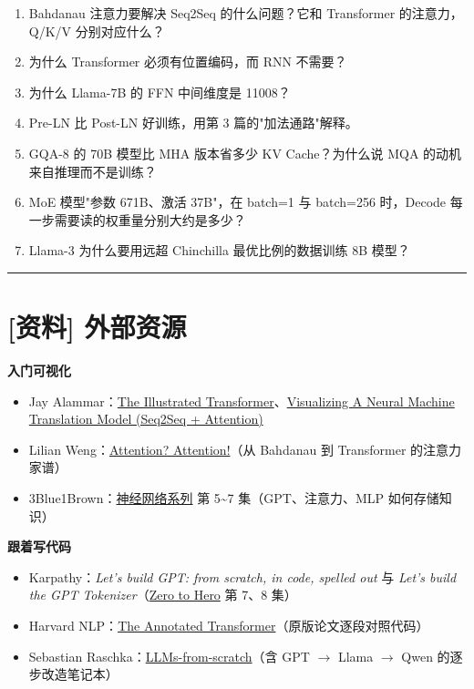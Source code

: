 \begin{enumerate}
  \item Bahdanau 注意力要解决 Seq2Seq 的什么问题？它和 Transformer 的注意力，Q/K/V 分别对应什么？
  \item 为什么 Transformer 必须有位置编码，而 RNN 不需要？
  \item 为什么 Llama-7B 的 FFN 中间维度是 11008？
  \item Pre-LN 比 Post-LN 好训练，用第 3 篇的"加法通路"解释。
  \item GQA-8 的 70B 模型比 MHA 版本省多少 KV Cache？为什么说 MQA 的动机来自推理而不是训练？
  \item MoE 模型"参数 671B、激活 37B"，在 batch=1 与 batch=256 时，Decode 每一步需要读的权重量分别大约是多少？
  \item Llama-3 为什么要用远超 Chinchilla 最优比例的数据训练 8B 模型？
\end{enumerate}

\vspace{0.8em}\hrule\vspace{0.8em}

\section{[资料] 外部资源}

\textbf{入门可视化}
\begin{itemize}
  \item Jay Alammar：\href{https://jalammar.github.io/illustrated-transformer/}{The Illustrated Transformer}、\href{https://jalammar.github.io/visualizing-neural-machine-translation-mechanics-of-seq2seq-models-with-attention/}{Visualizing A Neural Machine Translation Model (Seq2Seq + Attention)}
  \item Lilian Weng：\href{https://lilianweng.github.io/posts/2018-06-24-attention/}{Attention? Attention!}（从 Bahdanau 到 Transformer 的注意力家谱）
  \item 3Blue1Brown：\href{https://www.3blue1brown.com/topics/neural-networks}{神经网络系列} 第 5\textasciitilde{}7 集（GPT、注意力、MLP 如何存储知识）
\end{itemize}

\textbf{跟着写代码}
\begin{itemize}
  \item Karpathy：\textit{Let's build GPT: from scratch, in code, spelled out} 与 \textit{Let's build the GPT Tokenizer}（\href{https://karpathy.ai/zero-to-hero.html}{Zero to Hero} 第 7、8 集）
  \item Harvard NLP：\href{https://nlp.seas.harvard.edu/annotated-transformer/}{The Annotated Transformer}（原版论文逐段对照代码）
  \item Sebastian Raschka：\href{https://github.com/rasbt/LLMs-from-scratch}{LLMs-from-scratch}（含 GPT $\rightarrow$ Llama $\rightarrow$ Qwen 的逐步改造笔记本）
\end{itemize}

